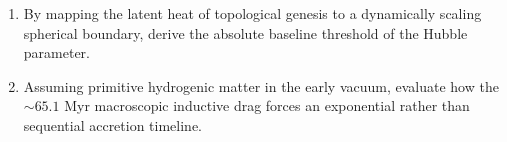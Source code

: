 \begin{exercisebox}
\begin{enumerate}
    \item By mapping the latent heat of topological genesis to a dynamically scaling spherical boundary, derive the absolute baseline threshold of the Hubble parameter.
    \item Assuming primitive hydrogenic matter in the early vacuum, evaluate how the $\sim 65.1$ Myr macroscopic inductive drag forces an exponential rather than sequential accretion timeline. 
\end{enumerate}
\end{exercisebox}